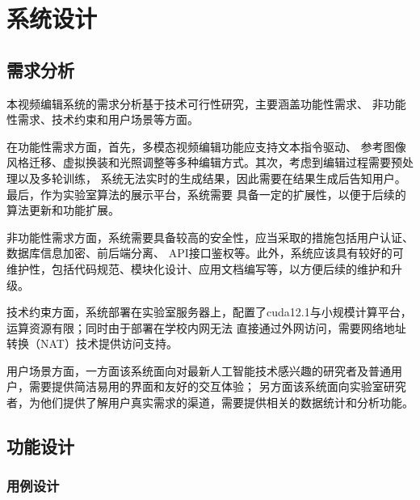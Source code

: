 \chapter{系统设计}

\section{需求分析}

本视频编辑系统的需求分析基于技术可行性研究，主要涵盖功能性需求、
非功能性需求、技术约束和用户场景等方面。

在功能性需求方面，首先，多模态视频编辑功能应支持文本指令驱动、
参考图像风格迁移、虚拟换装和光照调整等多种编辑方式。其次，考虑到编辑过程需要预处理以及多轮训练，
系统无法实时的生成结果，因此需要在结果生成后告知用户。最后，作为实验室算法的展示平台，系统需要
具备一定的扩展性，以便于后续的算法更新和功能扩展。

非功能性需求方面，系统需要具备较高的安全性，应当采取的措施包括用户认证、数据库信息加密、前后端分离、
API接口鉴权等。此外，系统应该具有较好的可维护性，包括代码规范、模块化设计、应用文档编写等，以方便后续的维护和升级。

技术约束方面，系统部署在实验室服务器上，配置了cuda12.1与小规模计算平台，运算资源有限；同时由于部署在学校内网无法
直接通过外网访问，需要网络地址转换（NAT）技术提供访问支持。

用户场景方面，一方面该系统面向对最新人工智能技术感兴趣的研究者及普通用户，需要提供简洁易用的界面和友好的交互体验；
另方面该系统面向实验室研究者，为他们提供了解用户真实需求的渠道，需要提供相关的数据统计和分析功能。

\section{功能设计}

\subsection{用例设计}

